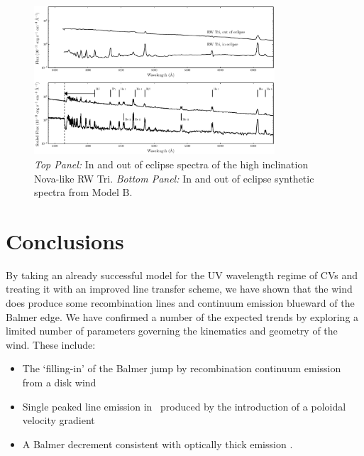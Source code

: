 \documentclass[preprint, a4paper, 11pt]{aastex}
\begin{document}
\begin{figure} %
\includegraphics[width=0.8\textwidth]{figures/fig13_eclipse.eps}
\caption{{\sl Top Panel:} In and out of eclipse spectra of the high
inclination Nova-like RW Tri. {\sl Bottom Panel:} In and out of eclipse synthetic
spectra from Model B.}
\label{rwtricomp}
\end{figure} %








%
%


\section{Conclusions}

By taking an already successful model
for the UV wavelength regime of CVs and treating 
it with an improved line transfer scheme, we have shown
that the wind does produce some recombination lines
and continuum emission blueward of the Balmer edge.
We have confirmed a number of the expected trends
by exploring a limited number of parameters governing the
kinematics and geometry of the wind. These include:

\renewcommand{\labelitemi}{$\bullet$}
\begin{itemize}
	\item The `filling-in' of the Balmer jump \citep{KLWB98} by recombination 
	continuum emission from a disk wind
	\item Single peaked line emission in \ha\ produced by 
	the introduction of a poloidal velocity gradient \citep{MC96}
	\item A Balmer decrement consistent with optically thick emission \citep{elitzur1983}.
\end{itemize}
\smallskip
\end{document}
